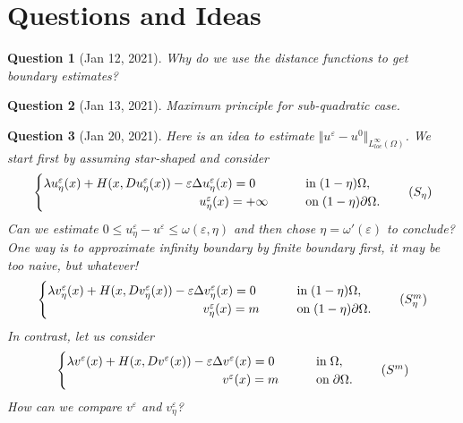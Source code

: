 \documentclass[11pt,reqno]{amsart}
\numberwithin{figure}{section}
\theoremstyle{plain}
\newtheorem{quest}{Question}
\theoremstyle{remark}
\numberwithin{equation}{section}
\begin{document}



\section{Questions and Ideas}
\begin{quest} [Jan 12, 2021] Why do we use the distance functions to get boundary estimates? 
\end{quest}

\begin{quest} [Jan 13, 2021] Maximum principle for sub-quadratic case.
\end{quest}

\begin{quest}[Jan 20, 2021] Here is an idea to estimate $\Vert u^\varepsilon - u^0\Vert_{L^\infty_{loc}(\Omega)}$. We start first by assuming star-shaped and consider
\begin{equation}\label{e:S_eta}
    \begin{cases}
    \lambda u_\eta^\varepsilon(x) + H(x,Du_\eta^\varepsilon(x)) - \varepsilon \Delta u_\eta^\varepsilon(x) = 0 &\qquad
    \text{in}\;(1-\eta)\Omega, \vspace{0cm}\\
    \qquad\qquad\qquad\qquad\qquad\qquad\;\, u^\varepsilon_\eta(x) = +\infty &\qquad
    \text{on}\;(1-\eta)\partial\Omega.
    \end{cases} \tag{$S_\eta$}
\end{equation}
Can we estimate $0\leq u^\varepsilon_\eta - u^\varepsilon \leq \omega(\varepsilon,\eta)$ and then chose $\eta = \omega'(\varepsilon)$ to conclude? One way is to approximate infinity boundary by finite boundary first, it may be too naive, but whatever! 
\begin{equation}\label{e:S_eta_m}
    \begin{cases}
    \lambda v_\eta^\varepsilon(x) + H(x,Dv_\eta^\varepsilon(x)) - \varepsilon \Delta v_\eta^\varepsilon(x) = 0 &\qquad
    \text{in}\;(1-\eta)\Omega, \vspace{0cm}\\
    \qquad\qquad\qquad\qquad\qquad\qquad\;\, v^\varepsilon_\eta(x) = m &\qquad
    \text{on}\;(1-\eta)\partial\Omega.
    \end{cases} \tag{$S_{\eta}^m$}
\end{equation}
In contrast, let us consider
\begin{equation}\label{e:S_0}
    \begin{cases}
    \lambda v^\varepsilon(x) + H(x,Dv^\varepsilon(x)) - \varepsilon \Delta v^\varepsilon(x) = 0 &\qquad
    \text{in}\;\Omega, \vspace{0cm}\\
    \qquad\qquad\qquad\qquad\qquad\qquad\;\, v^\varepsilon(x) = m &\qquad
    \text{on}\;\partial\Omega.
    \end{cases} \tag{$S^m$}
\end{equation}
How can we compare $v^\varepsilon$ and $v^\varepsilon_\eta$?
\end{quest}
\end{document}
